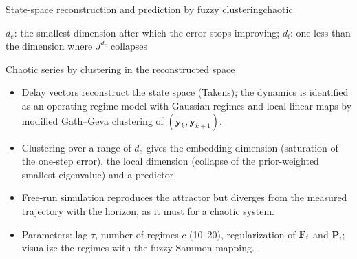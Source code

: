 \begin{algobox}{State-space reconstruction and prediction by fuzzy clustering}{chaotic}
\begin{algorithm}[H]
$d_e$: the smallest dimension after which the error stops improving; $d_l$: one less than the dimension where $J^{d_e}$ collapses\;
\end{algorithm}
\end{algobox}
\begin{summarybox}{Chaotic series by clustering in the reconstructed space}
\begin{itemize}
  \item Delay vectors reconstruct the state space (Takens); the dynamics is identified as an operating-regime model with Gaussian regimes and local linear maps by modified Gath--Geva clustering of $(\mathbf{y}_k,\mathbf{y}_{k+1})$.
  \item Clustering over a range of $d_e$ gives the embedding dimension (saturation of the one-step error), the local dimension (collapse of the prior-weighted smallest eigenvalue) and a predictor.
  \item Free-run simulation reproduces the attractor but diverges from the measured trajectory with the horizon, as it must for a chaotic system.
  \item Parameters: lag $\tau$, number of regimes $c$ (10--20), regularization of $\mathbf{F}_i$ and $\mathbf{P}_i$; visualize the regimes with the fuzzy Sammon mapping.
\end{itemize}
\end{summarybox}

